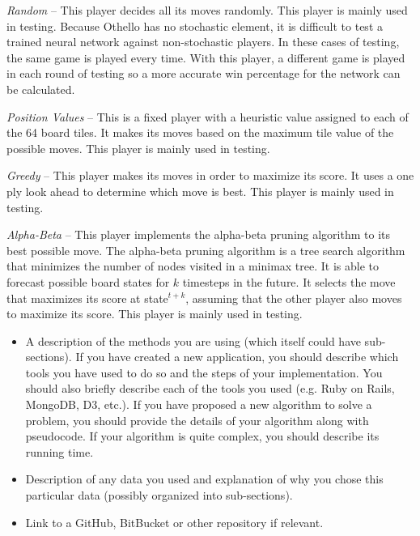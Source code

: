 \documentclass{sig-alternate-05-2015}
\begin{document}
\emph{Random} -- This player decides all its moves randomly. This player is mainly used in testing. Because Othello has no stochastic element, it is difficult to test a trained neural network against non-stochastic players. In these cases of testing, the same game is played every time. With this player, a different game is played in each round of testing so a more accurate win percentage for the network can be calculated.

\emph{Position Values} -- This is a fixed player with a heuristic value assigned to each of the 64 board tiles. It makes its moves based on the maximum tile value of the possible moves. This player is mainly used in testing.

\emph{Greedy} -- This player makes its moves in order to maximize its score. It uses a one ply look ahead to determine which move is best. This player is mainly used in testing.

\emph{Alpha-Beta} -- This player implements the alpha-beta pruning algorithm to its best possible move. The alpha-beta pruning algorithm is a tree search algorithm that minimizes the number of nodes visited in a minimax tree. It is able to forecast possible board states for $k$ timesteps in the future. It selects the move that maximizes its score at state$^{t+k}$, assuming that the other player also moves to maximize its score. This player is mainly used in testing.




\begin{itemize}
		
\item	A description of the methods you are using (which itself could have
	sub-sections). If you have created a new application, you should describe
	which tools you have used to do so and the steps of your implementation. You
	should also briefly describe each of the tools you used (e.g. Ruby on Rails,
	MongoDB, D3, etc.). If you have proposed a new algorithm to solve a problem,
	you should provide the details of your algorithm along with pseudocode. If
	your algorithm is quite complex, you should describe its running time.  

\item Description of any data you used and explanation of why you chose this
	particular data (possibly organized into sub-sections).

\item Link to a GitHub, BitBucket or other repository if relevant.

\end{itemize}
\end{document}
